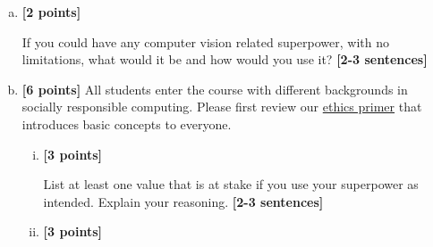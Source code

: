 \documentclass[11pt]{article}
\begin{document}
\begin{enumerate}[(a)]
    \item 
\textbf{[2 points]} 
\begin{tcolorbox}[colback=orange!5!white,colframe=orange!75!black]
If you could have any computer vision related superpower, with no limitations, what would it be and how would you use it? \textbf{[2-3 sentences]}
\end{tcolorbox}




    \item \textbf{[6 points]}
All students enter the course with different backgrounds in socially responsible computing. Please first review our \href{https://browncsci1430.github.io/webpage/resources/ethics_guide/}{ethics primer} that introduces basic concepts to everyone.

    \begin{enumerate}[(i)]
    \item \textbf{[3 points]}
    \begin{tcolorbox}[colback=orange!5!white,colframe=orange!75!black]
    
    List at least one value that is at stake if you use your superpower as intended. Explain your reasoning. \textbf{[2-3 sentences]}
    \end{tcolorbox}
    
    \item \textbf{[3 points]}
    \begin{tcolorbox}[colback=orange!5!white,colframe=orange!75!black]
    

\end{tcolorbox}
\end{enumerate}
\end{enumerate}
\end{document}
